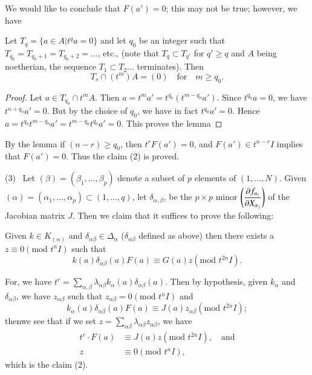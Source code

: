 We would like to conclude that $F(a')=0$; this may not be true;
however, we have

\begin{lemma}\label{part2-lem2.1}
Let $T_{q}=\{a\in A|t^{q}a=0\}$ and let $q_{0}$ be an integer such
that $T_{q_{0}}=T_{q_{0}+1}=T_{q_{0}+2}=\ldots$, etc., (note that
$T_{q}\subset T_{q'}$ for $q'\geq q$ and $A$ being noetherian, the
sequence $T_{1}\subset T_{2}\ldots$ terminates). Then
$$
T_{s}\cap (t^{m})A=(0)\quad\text{for}\quad m\geq q_{0}.
$$
\end{lemma}

\begin{proof}
Let $a\in T_{q_{0}}\cap t^{m}A$. Then
$a=t^{m}a'=t^{q_{0}}(t^{m-q_{0}}a')$. Since $t^{q_{0}}a=0$, we have
$t^{n+q_{0}}a'=0$. But by the choice of $q_{0}$, we have in fact
$t^{q_{0}}a'=0$. Hence
$a=t^{q_{0}}t^{m-q_{0}}a'=t^{m-q_{0}}t^{q_{0}}a'=0$. This proves the lemma
\end{proof}

By the lemma if $(n-r)\geq q_{0}$, then $t^{r}F(a')=0$, and $F(a')\in
t^{n-r}I$ implies that $F(a')=0$. Thus the claim (2) is proved.

\smallskip
(3)~ Let $(\beta)=(\beta_{1},\ldots,\beta_{p})$ denote a subset of $p$
elements of $(1,\ldots,N)$. Given
$(\alpha)=(\alpha_{1},\ldots,\alpha_{p})\subset (1,\ldots,q)$, let
$\delta_{\alpha,\beta}$, be the $p\times p$ minor $\left(\dfrac{\partial
  f_{\alpha_{i}}}{\partial X_{\alpha_{j}}}\right)$ of the Jacobian matrix
$J$. Then we claim that it suffices to prove the following:

Given $k\in K_{(\alpha)}$ and $\delta_{\alpha\beta}\in\Delta_{\alpha}$
($\delta_{\alpha\beta}$ defined as above) then there exists a $z\equiv
0(\text{mod~}t^{n}I)$ such that
$$
k(a)\delta_{\alpha\beta}(a)F(a)\equiv G(a)z(\text{mod~}t^{2n}I).
$$

For, we have
$t^{r}=\sum\limits_{\alpha,\beta}\lambda_{\alpha\beta}k_{\alpha}(a)\delta_{\alpha\beta}(a)$. Then
by hypothesis, given $k_{\alpha}$ and $\delta_{\alpha\beta}$, we have
$z_{\alpha\beta}$ such that $z_{\alpha\beta}=0(\text{mod~}t^{n}I)$ and
$$
k_{\alpha}(a)\delta_{\alpha\beta}(a)F(a)\equiv
J(a)z_{\alpha\beta}(\text{mod~}t^{2n}I); 
$$
then\pageoriginale we see that if we set
$z=\sum\limits_{\alpha\beta}\lambda_{\alpha\beta}z_{\alpha\beta}$, we
have
\begin{align*}
t^{r}\cdot F(a) &\equiv J(a)z(\text{mod~}t^{2n}I),\quad\text{and}\\
z &\equiv 0(\text{mod~}t^{n}I),
\end{align*}
which is the claim (2).

